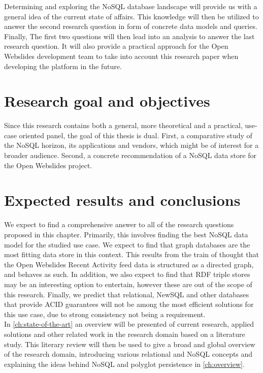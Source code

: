 Determining and exploring the NoSQL database landscape will provide us with a general idea of the current state of affairs.
This knowledge will then be utilized to answer the second research question in form of concrete data models and queries.
Finally, The first two questions will then lead into an analysis to answer the last research question.
It will also provide a practical approach for the Open Webslides development team to take into account this research paper when developing the platform in the future.

\section{Research goal and objectives}
\label{sec:research-goal-and-objectives}

Since this research contains both a general, more theoretical and a practical, use-case oriented panel, the goal of this thesis is dual.
First, a comparative study of the NoSQL horizon, its applications and vendors, which might be of interest for a broader audience.
Second, a concrete recommendation of a NoSQL data store for the Open Webslides project.

\section{Expected results and conclusions}
\label{sec:expected-results-and-conclusions}

We expect to find a comprehensive answer to all of the research questions proposed in this chapter.
Primarily, this involves finding the best NoSQL data model for the studied use case.
We expect to find that graph databases are the most fitting data store in this context.
This results from the train of thought that the Open Webslides Recent Activity feed data is structured as a directed graph, and behaves as such.
In addition, we also expect to find that RDF triple stores may be an interesting option to entertain, however these are out of the scope of this research.
Finally, we predict that relational, NewSQL and other databases that provide ACID guarantees will not be among the most efficient solutions for this use case, due to strong consistency not being a requirement.\\

In \cref{ch:state-of-the-art} an overview will be presented of current research, applied solutions and other related work in the research domain based on a literature study.
This literary review will then be used to give a broad and global overview of the research domain, introducing various relational and NoSQL concepts and explaining the ideas behind NoSQL and polyglot persistence in \cref{ch:overview}.


